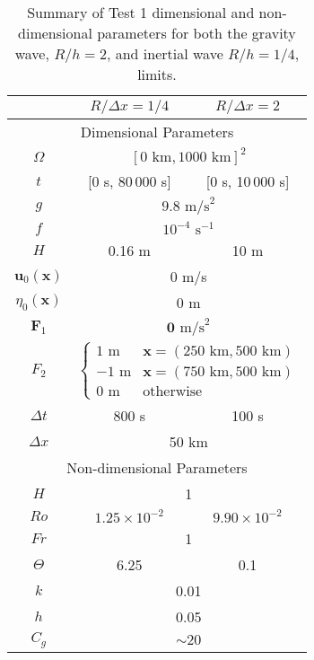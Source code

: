   \def\arraystretch{1.25} %
  \begin{table}[H]
    \begin{center}
      \begin{tabular}{|c|c|c|}
        \hline
        & $R/\Delta x = 1/4$ & $R/\Delta x = 2$ \\[0.1em] \hline \hline
        \multicolumn{3}{|c|}{Dimensional Parameters} \\ \hline
        $\Omega$ & \multicolumn{2}{c|}{$[0\text{ km}, 1000\text{ km}]^2$} \\ \hline
        $t$ & [0 s, 80\,000 s] & [0 s, 10\,000 s] \\ \hline
        $g$ & \multicolumn{2}{c|}{$9.8\text{ m/s}^2$} \\ \hline 
        $f$ & \multicolumn{2}{c|}{$10^{-4}\text{ s}^{-1}$} \\ \hline
        $H$ & 0.16 m & 10 m \\ \hline
        $\mathbf{u}_0(\mathbf{x})$ & \multicolumn{2}{c|}{0 m/s} \\ \hline
        $\eta_0(\mathbf{x})$ & \multicolumn{2}{c|}{0 m} \\ \hline
        $\mathbf{F}_1$ & \multicolumn{2}{c|}{ $\mathbf{0}\text{ m/s}^2$} \\ \hline
        $F_2$ & \multicolumn{2}{c|}{$
          \begin{cases} 
            1\text{ m} & \mathbf{x} = (250\text{ km}, 500\text{ km}) \\
            -1\text{ m} & \mathbf{x} = (750\text{ km}, 500\text{ km}) \\
            0\text{ m} & \text{otherwise}
          \end{cases}$} \\ \hline
        $\Delta t$ & 800 s & 100 s \\ \hline
        $\Delta x$ & \multicolumn{2}{c|}{50 km} \\ \hline \hline
        \multicolumn{3}{|c|}{Non-dimensional Parameters} \\ \hline
        $H$ & \multicolumn{2}{c|}{1} \\ \hline \hline
        $Ro$ & $1.25\times 10^{-2}$ & $9.90\times10^{-2}$ \\ \hline
        $Fr$ & \multicolumn{2}{c|}{1} \\ \hline
        $\Theta$ & 6.25 & 0.1 \\ \hline
        $k$ & \multicolumn{2}{c|}{0.01} \\ \hline
        $h$ & \multicolumn{2}{c|}{0.05} \\ \hline \hline
        $C_g$ & \multicolumn{2}{c|}{$\sim 20$} \\ \hline
      \end{tabular}
      \caption{Summary of Test 1 dimensional and non-dimensional parameters for
      both the gravity wave, $R/h = 2$, and inertial wave $R/h = 1/4$, limits.}
      \label{tab:HFElevationParams}
    \end{center}
  \end{table}

